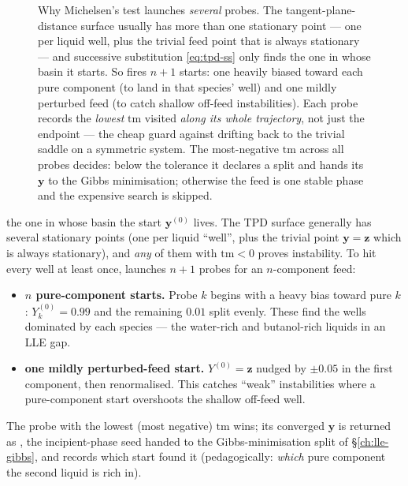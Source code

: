 \documentclass[11pt,a4paper]{article}
\newcommand{\yv}{\mathbf{y}}
\newcommand{\zv}{\mathbf{z}}
\begin{document}
\begin{figure}[ht]
\begin{tikzpicture}
\end{tikzpicture}
\caption{Why Michelsen's test launches \emph{several} probes.  The
tangent-plane-distance surface usually has more than one stationary
point --- one per liquid well, plus the trivial feed point that is always
stationary --- and successive substitution \eqref{eq:tpd-ss} only finds
the one in whose basin it starts.  So  fires $n{+}1$
starts: one heavily biased toward each pure component (to land in that
species' well) and one mildly perturbed feed (to catch shallow
off-feed instabilities).  Each probe records the \emph{lowest}
$\mathrm{tm}$ visited \emph{along its whole trajectory}, not just the
endpoint --- the cheap guard against drifting back to the trivial saddle
on a symmetric system.  The most-negative $\mathrm{tm}$ across all
probes decides: below the tolerance it declares a split and hands its
$\yv$ to the Gibbs minimisation; otherwise the feed is one stable phase
and the expensive search is skipped.}
\label{fig:michelsen-probes}
\end{figure}

the one in whose basin the start $\yv^{(0)}$ lives.  The TPD surface
generally has several stationary points (one per liquid ``well'',
plus the trivial point $\yv = \zv$ which is always stationary), and
\emph{any} of them with $\mathrm{tm} < 0$ proves instability.  To
hit every well at least once,  launches $n+1$
probes for an $n$-component feed:
\begin{itemize}[leftmargin=*,nosep]
  \item \textbf{$n$ pure-component starts.}  Probe $k$ begins with a
        heavy bias toward pure $k$: $Y^{(0)}_k = 0.99$ and the
        remaining $0.01$ split evenly.  These find the wells dominated
        by each species --- the water-rich and butanol-rich liquids in
        an LLE gap.
  \item \textbf{one mildly perturbed-feed start.}  $Y^{(0)} = \zv$
        nudged by $\pm 0.05$ in the first component, then
        renormalised.  This catches ``weak'' instabilities where a
        pure-component start overshoots the shallow off-feed well.
\end{itemize}
The probe with the lowest (most negative) $\mathrm{tm}$ wins; its
converged $\yv$ is returned as , the incipient-phase
seed handed to the Gibbs-minimisation split of
\S\ref{ch:lle-gibbs}, and  records which start found
it (pedagogically: \emph{which} pure component the second liquid is
rich in).
\end{document}
